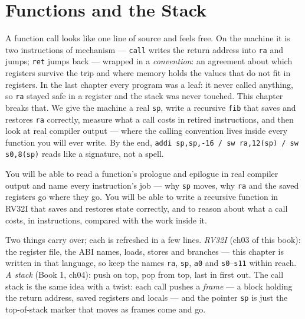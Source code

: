 \chapter{Functions and the Stack}
\label{ch:stack}

A function call looks like one line of source and feels free. On the
machine it is two instructions of mechanism --- \texttt{call} writes
the return address into \texttt{ra} and jumps; \texttt{ret} jumps back
--- wrapped in a \emph{convention}: an agreement about which registers
survive the trip and where memory holds the values that do not fit in
registers. In the last chapter every program was a leaf: it never
called anything, so \texttt{ra} stayed safe in a register and the
stack was never touched. This chapter breaks that. We give the machine
a real \texttt{sp}, write a recursive \texttt{fib} that saves and
restores \texttt{ra} correctly, measure what a call costs in retired
instructions, and then look at real compiler output --- where the
calling convention lives inside every function you will ever write.
By the end, \texttt{addi sp,sp,-16 / sw ra,12(sp) / sw s0,8(sp)} reads
like a signature, not a spell.

\begin{wins}
You will be able to read a function's prologue and epilogue in real
compiler output and name every instruction's job --- why \texttt{sp}
moves, why \texttt{ra} and the saved registers go where they go. You
will be able to write a recursive function in RV32I that saves and
restores state correctly, and to reason about what a call costs, in
instructions, compared with the work inside it.
\end{wins}

\begin{rulebox}
Two things carry over; each is refreshed in a few lines.
\emph{RV32I} (ch03 of this book): the register file, the ABI names,
loads, stores and branches --- this chapter is written in that
language, so keep the names \texttt{ra}, \texttt{sp}, \texttt{a0}
and \texttt{s0}--\texttt{s11} within reach.
\emph{A stack} (Book 1, ch04): push on top, pop from top, last in
first out. The call stack is the same idea with a twist: each call
pushes a \emph{frame} --- a block holding the return address, saved
registers and locals --- and the pointer \texttt{sp} is just the
top-of-stack marker that moves as frames come and go.
\end{rulebox}

